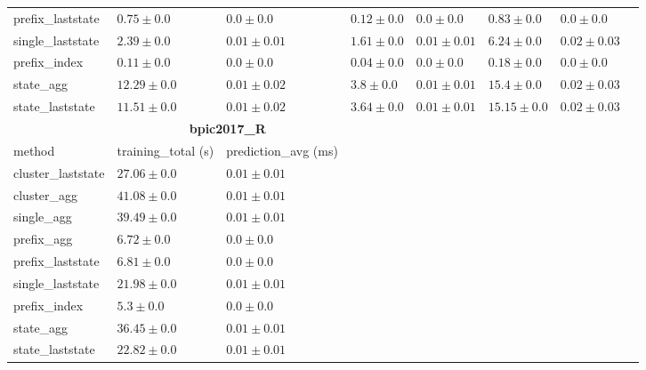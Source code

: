 \documentclass[twoside,11pt]{Latex/Classes/PhDthesisPSnPDF}
\begin{document}
\begin{table}[!htbp]
{\begin{tabular}{llllllll}
			prefix\_laststate & $0.75 \pm 0.0$ & $\mathbf{0.0 \pm 0.0}$ & $0.12 \pm 0.0$ & $\mathbf{0.0 \pm 0.0}$ & $0.83 \pm 0.0$ & $\mathbf{0.0 \pm 0.0}$ \\ 
			single\_laststate & $2.39 \pm 0.0$ & $0.01 \pm 0.01$ & $1.61 \pm 0.0$ & $0.01 \pm 0.01$ & $6.24 \pm 0.0$ & $0.02 \pm 0.03$ \\ 
			prefix\_index & $\mathbf{0.11 \pm 0.0}$ & $\mathbf{0.0 \pm 0.0}$ & $\mathbf{0.04 \pm 0.0}$ & $\mathbf{0.0 \pm 0.0}$ & $\mathbf{0.18 \pm 0.0}$ & $\mathbf{0.0 \pm 0.0}$ \\ 
			state\_agg & $12.29 \pm 0.0$ & $0.01 \pm 0.02$ & $3.8 \pm 0.0$ & $0.01 \pm 0.01$ & $15.4 \pm 0.0$ & $0.02 \pm 0.03$ \\ 
			state\_laststate & $11.51 \pm 0.0$ & $0.01 \pm 0.02$ & $3.64 \pm 0.0$ & $0.01 \pm 0.01$ & $15.15 \pm 0.0$ & $0.02 \pm 0.03$ \\ 
			\bottomrule
			\toprule
			& \multicolumn{2}{c}{{\bfseries bpic2017\_R}} \\ \cmidrule(lr){2-3} \cmidrule(lr){4-5} \cmidrule(lr){6-7}
			method  & training\_total (s) & prediction\_avg (ms) \\ \midrule
			cluster\_laststate & $27.06 \pm 0.0$ & $0.01 \pm 0.01$ \\ 
			cluster\_agg & $41.08 \pm 0.0$ & $0.01 \pm 0.01$ \\ 
			single\_agg & $39.49 \pm 0.0$ & $0.01 \pm 0.01$ \\ 
			prefix\_agg & $6.72 \pm 0.0$ & $\mathbf{0.0 \pm 0.0}$ \\ 
			prefix\_laststate & $6.81 \pm 0.0$ & $\mathbf{0.0 \pm 0.0}$ \\ 
			single\_laststate & $21.98 \pm 0.0$ & $0.01 \pm 0.01$ \\ 
			prefix\_index & $\mathbf{5.3 \pm 0.0}$ & $\mathbf{0.0 \pm 0.0}$ \\ 
			state\_agg & $36.45 \pm 0.0$ & $0.01 \pm 0.01$ \\ 
			state\_laststate & $22.82 \pm 0.0$ & $0.01 \pm 0.01$ \\ 
			\bottomrule
			
			
			
		\end{tabular}%
	}
	
	
\end{table}


\end{document}
